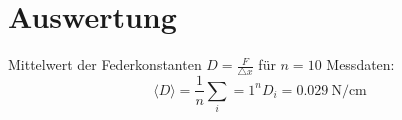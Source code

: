 \section{Auswertung}
\label{sec:Auswertung}
Mittelwert der Federkonstanten $D = \frac{F}{\triangle x}$ für $n = 10$ Messdaten: 
\begin{equation}
\langle D \rangle = \frac{1}{n} \sum_i=1^n D_i = \SI{0.029}{\newton\per\centi\meter}
\end{equation}